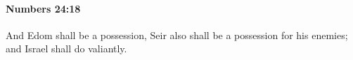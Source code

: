 
		\paragraph{Numbers 24:18} %
			\label{NUMBERS-24-18}

			And Edom shall be a possession, Seir also shall be a possession for his enemies; and Israel shall do valiantly.


